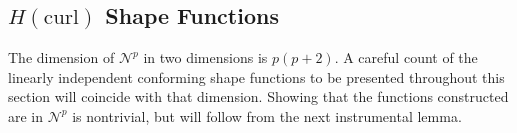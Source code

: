 

%
%

\subsection{\texorpdfstring{$H(\mathrm{curl})$}{Hcurl} Shape Functions}


The dimension of $\mathcal{N}^p$ in two dimensions is $p(p+2)$.
A careful count of the linearly independent conforming shape functions to be presented throughout this section will coincide with that dimension. 
Showing that the functions constructed are in $\mathcal{N}^p$ is nontrivial, but will follow from the next instrumental lemma.%

